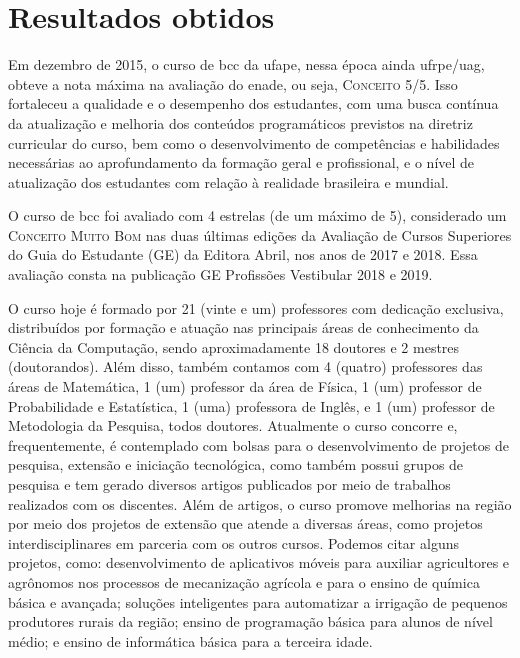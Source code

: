 \documentclass[
	12pt,				%
	openright,			%
  oneside,     %
	a4paper,			%
 hyphens,
	chapter=TITLE,		%
	english,			%
	french,				%
	spanish,			%
	brazil				%
	]{abntex2}
\begin{document}
\section{Resultados obtidos}

Em dezembro de 2015, o curso de \acrshort{bcc} da \acrshort{ufape}, nessa época ainda \acrshort{ufrpe}/\acrshort{uag}, obteve a nota máxima na avaliação do \acrfull{enade}, ou seja, \textsc{Conceito 5/5}. Isso fortaleceu a qualidade e o desempenho dos estudantes, com uma busca contínua da atualização e melhoria dos conteúdos programáticos previstos na diretriz curricular do curso, bem como o desenvolvimento de competências e habilidades necessárias ao aprofundamento da formação geral e profissional, e o nível de atualização dos estudantes com relação à realidade brasileira e mundial.

O curso de \acrshort{bcc} foi avaliado com 4 estrelas (de um máximo de 5), considerado um \textsc{Conceito Muito Bom} nas duas últimas edições da Avaliação de Cursos Superiores do Guia do Estudante (GE) da Editora Abril, nos anos de 2017 e 2018. Essa avaliação consta na publicação GE Profissões Vestibular 2018 e 2019.

O curso hoje é formado por 21 (vinte e um) professores com dedicação exclusiva, distribuídos por formação e atuação nas principais áreas de conhecimento da Ciência da Computação, sendo aproximadamente 18 doutores e 2 mestres (doutorandos). Além disso, também contamos com 4 (quatro) professores das áreas de Matemática, 1 (um) professor da área de Física, 1 (um) professor de Probabilidade e Estatística, 1 (uma) professora de Inglês, e 1 (um) professor de Metodologia da Pesquisa, todos doutores. Atualmente o curso concorre e, frequentemente, é contemplado com bolsas para o desenvolvimento de projetos de pesquisa, extensão e iniciação tecnológica, como também possui grupos de pesquisa e tem gerado diversos artigos publicados por meio de trabalhos realizados com os discentes. Além de artigos, o curso promove melhorias na região por meio dos projetos de extensão que atende a diversas áreas, como projetos interdisciplinares em parceria com os outros cursos. Podemos citar alguns projetos, como: desenvolvimento de aplicativos móveis para auxiliar agricultores e agrônomos nos processos de mecanização agrícola e para o ensino de química básica e avançada; soluções inteligentes para automatizar a irrigação de pequenos produtores rurais da região; ensino de programação básica para alunos de nível médio; e ensino de informática básica para a terceira idade.
\end{document}
